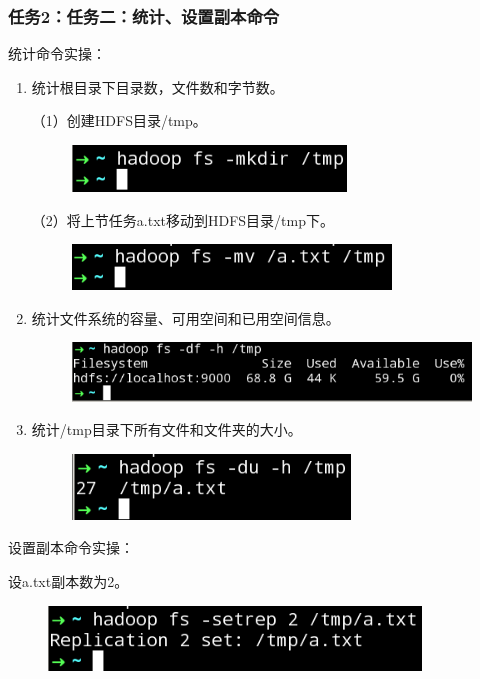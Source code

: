 \documentclass {article}
\begin{document}
	 		\subsubsection{任务2：任务二：统计、设置副本命令}
	 			统计命令实操：
	 			\begin{enumerate}
	 				\item 统计根目录下目录数，文件数和字节数。
	 				
	 				（1）创建HDFS目录/tmp。
	 				\begin{figure}[H]
	 					\centering
	 					\includegraphics{figures/fig23.png}
	 				\end{figure}
	 				
	 				（2）将上节任务a.txt移动到HDFS目录/tmp下。
	 				\begin{figure}[H]
	 					\centering
	 					\includegraphics{figures/fig24.png}
	 				\end{figure}
 				
 					\item 统计文件系统的容量、可用空间和已用空间信息。
 					\begin{figure}[H]
 						\centering
 						\includegraphics[width=4.5in]{figures/fig25.png}
 					\end{figure}
 				
 					\item 统计/tmp目录下所有文件和文件夹的大小。
 					\begin{figure}[H]
 						\centering
 						\includegraphics{figures/fig26.png}
 					\end{figure}
	 			\end{enumerate}
			
				设置副本命令实操：
				
				设a.txt副本数为2。
				\begin{figure}[H]
					\centering
					\includegraphics{figures/fig27.png}
				\end{figure}
	
\end{document}
